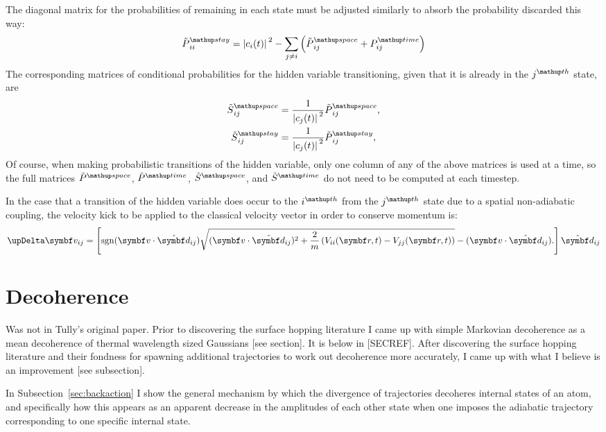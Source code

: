 The diagonal matrix for the probabilities of remaining in each state must be adjusted similarly to absorb the probability discarded this way:
\begin{align}
\tilde P^\up{stay}_{ii} = 
\abs{c_i(t)}^2 - \sum_{j\neq i}\left(\tilde P^\up{space}_{ij} + P^\up{time}_{ij}\right)
\end{align}
The corresponding matrices of conditional probabilities for the hidden variable transitioning, given that it is already in the $j^\up{th}$ state, are
\begin{align}
\tilde S^\up{space}_{ij} &= \frac1{\abs{c_j(t)}^2} \tilde P^\up{space}_{ij},\\
\tilde S^\up{stay}_{ij} &= \frac1{\abs{c_j(t)}^2} \tilde P^\up{stay}_{ij},
\end{align}
Of course, when making probabilistic transitions of the hidden variable, only one
column of any of the above matrices is used at a time, so the full matrices $\tilde P^\up{space}$, $\tilde P^\up{time}$, $\tilde S^\up{space}$, and $\tilde S^\up{time}$ do not need to be computed at each timestep.

In the case that a transition of the hidden variable does occur to the $i^\up{th}$ from the $j^\up{th}$ state due to a spatial non-adiabatic coupling, the velocity kick to be applied to the classical velocity vector in order to conserve momentum is:
\begin{align}
\upDelta \vec v_{ij} = \left[\sgn(\vec v\cdot \hat{\vec d}_{ij})
\sqrt{(\vec v\cdot \hat{\vec d}_{ij})^2 + \frac2m\left(V_{ii}(\vec r, t) - V_{jj}(\vec r, t)\right)} - (\vec v\cdot \hat{\vec d}_{ij}).
\right]\hat{\vec d}_{ij}
\end{align}   

\section{Decoherence}\label{sec:decoherence}

Was not in Tully's original paper. Prior to discovering the surface hopping literature I came up with simple Markovian decoherence as a mean decoherence of thermal wavelength sized Gaussians [see section]. It is below in [SECREF]. After discovering the surface hopping literature and their fondness for spawning additional trajectories to work out decoherence more accurately, I came up with what I believe is an improvement [see subsection].

In Subsection~\ref{sec:backaction} I show the general mechanism by which the divergence of trajectories decoheres internal states of an atom, and specifically how this appears as an apparent decrease in the amplitudes of each other state when one imposes the adiabatic trajectory corresponding to one specific internal state.

